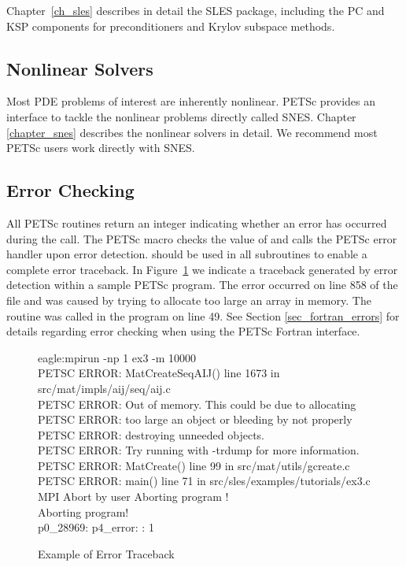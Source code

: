 Chapter~\ref{ch_sles} describes in detail the SLES package, including
the PC and KSP components for preconditioners and Krylov subspace methods.

\subsection*{Nonlinear Solvers}
Most PDE problems of interest are inherently nonlinear. PETSc provides 
an interface to tackle the nonlinear problems directly called SNES. Chapter
\ref{chapter_snes} describes the nonlinear solvers in detail. We recommend 
most PETSc users work directly with SNES.

\subsection*{Error Checking}

All PETSc routines return an integer indicating whether an error
has occurred during the call.  The PETSc macro 
checks the value of  and calls the PETSc error handler
upon error detection.   should be used in all
subroutines to enable a complete error traceback.
In Figure~\ref{fig_traceback} we indicate a
traceback generated by error detection within a sample PETSc
program. The error occurred on line 858 of the file  and was caused by trying to allocate too
large an array in memory. The routine was called in the program 
 on line 49.  See Section \ref{sec_fortran_errors} for
details regarding error checking when using the PETSc Fortran interface.

\begin{figure}[H]
\begin{tabbing}
   eagle:mpirun -np 1 ex3 -m 10000\\
   PETSC ERROR: MatCreateSeqAIJ() line 1673 in src/mat/impls/aij/seq/aij.c\\
   PETSC ERROR:   Out of memory. This could be due to allocating\\
   PETSC ERROR:   too large an object or bleeding by not properly\\
   PETSC ERROR:   destroying unneeded objects.\\
   PETSC ERROR:   Try running with -trdump for more information.\\ 
   PETSC ERROR: MatCreate() line 99 in src/mat/utils/gcreate.c  \\
   PETSC ERROR: main() line 71 in src/sles/examples/tutorials/ex3.c\\  
    MPI Abort by user Aborting program !\\
    Aborting program!\\
   p0\_28969:  p4\_error: : 1
\end{tabbing}
\nobreak
\caption{Example of Error Traceback}
\label{fig_traceback}
\end{figure}


